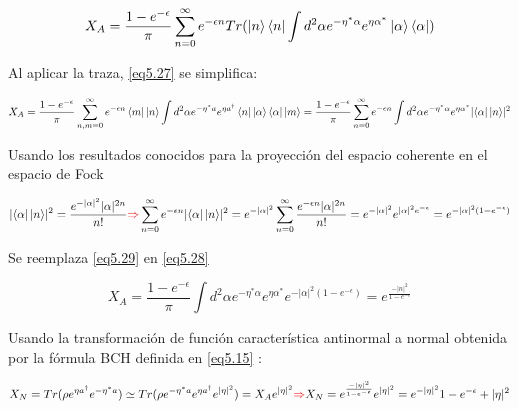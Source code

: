 \documentclass{book}
\begin{document}
\begin{equation}\label{eq5.27}X_A=\frac{1-e^{-\epsilon}}{\pi} \sum_{n=0}^\infty e^{-\epsilon n}Tr(\ket{n}\bra{n}\int d^2\alpha e^{-\eta^* \alpha}e^{\eta \alpha^*}\ket{\alpha}\bra{\alpha}) \end{equation}

Al aplicar la traza, \ref{eq5.27} se simplifica:

\begin{equation}\label{eq5.28}X_A=\frac{1-e^{-\epsilon}}{\pi} \sum_{n,m=0}^\infty e^{-\epsilon n}\bra{m}\ket{n}\int d^2\alpha e^{-\eta^* a}e^{\eta a^\dag}\bra{n}\ket{\alpha}\bra{\alpha}\ket{m}=\frac{1-e^{-\epsilon}}{\pi} \sum_{n=0}^\infty e^{-\epsilon n}\int d^2\alpha e^{-\eta^* \alpha}e^{\eta \alpha^*}\lvert\bra{\alpha}\ket{n}\rvert^2\end{equation}

Usando los resultados conocidos para la proyección del espacio coherente en el espacio de Fock

\begin{equation}\label{eq5.29}\lvert\bra{\alpha}\ket{n}\rvert^2=\frac{e^{-\lvert\alpha\rvert^2}\lvert\alpha\rvert^{2n}}{n!}\textcolor{red}{\Rightarrow}\sum_{n=0}^\infty e^{-\epsilon n}\lvert\bra{\alpha}\ket{n}\rvert^2=e^{-\lvert\alpha\rvert^2}\sum_{n=0}^\infty \frac{e^{-\epsilon n}\lvert\alpha\rvert^{2n}}{n!}= e^{-\lvert\alpha\rvert^2}e^{\lvert \alpha\rvert^2e^{-\epsilon}}=e^{-\lvert\alpha\rvert^2(1-e^{-\epsilon})}\end{equation}

Se reemplaza \ref{eq5.29} en \ref{eq5.28}

\begin{equation}\label{eq5.30}X_A=\frac{1-e^{-\epsilon}}{\pi} \int d^2\alpha e^{-\eta^* \alpha}e^{\eta \alpha^*}e^{-\lvert\alpha\rvert^2(1-e^{-\epsilon})}=e^{\frac{-\lvert n\rvert^2}{1-e^{-\epsilon}}}\end{equation}

Usando la transformación de función característica antinormal a normal obtenida por la fórmula BCH definida en \ref{eq5.15} :

\begin{equation}\label{eq5.31}X_N=Tr(\rho e^{\eta a^\dag}e^{-\eta^* a})\simeq Tr(\rho e^{-\eta^* a }e^{\eta a^\dag}e^{\lvert\eta\rvert^2})=X_Ae^{\lvert\eta\rvert^2}\textcolor{red}{\Rightarrow} X_N=e^{\frac{-\lvert \eta\rvert^2}{1-e^{-\epsilon}}}e^{\lvert\eta\rvert^2}=e^{-\lvert \eta\rvert^2}{1-e^{-\epsilon}+\lvert\eta\rvert^2}\end{equation}
\end{document}
